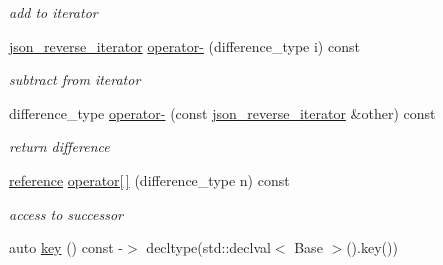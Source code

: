 \begin{DoxyCompactItemize}
\begin{DoxyCompactList}\small\item\em add to iterator \end{DoxyCompactList}\item 
\hyperlink{classnlohmann_1_1detail_1_1json__reverse__iterator}{json\+\_\+reverse\+\_\+iterator} \hyperlink{classnlohmann_1_1detail_1_1json__reverse__iterator_a9c9404de5f78134575e5f0aead10676f}{operator-\/} (difference\+\_\+type i) const \hypertarget{classnlohmann_1_1detail_1_1json__reverse__iterator_a9c9404de5f78134575e5f0aead10676f}{}\label{classnlohmann_1_1detail_1_1json__reverse__iterator_a9c9404de5f78134575e5f0aead10676f}

\begin{DoxyCompactList}\small\item\em subtract from iterator \end{DoxyCompactList}\item 
difference\+\_\+type \hyperlink{classnlohmann_1_1detail_1_1json__reverse__iterator_a2133803d87acc5bbb89f4c72adc43a0a}{operator-\/} (const \hyperlink{classnlohmann_1_1detail_1_1json__reverse__iterator}{json\+\_\+reverse\+\_\+iterator} \&other) const \hypertarget{classnlohmann_1_1detail_1_1json__reverse__iterator_a2133803d87acc5bbb89f4c72adc43a0a}{}\label{classnlohmann_1_1detail_1_1json__reverse__iterator_a2133803d87acc5bbb89f4c72adc43a0a}

\begin{DoxyCompactList}\small\item\em return difference \end{DoxyCompactList}\item 
\hyperlink{classnlohmann_1_1detail_1_1json__reverse__iterator_a42f51a69bac7b2aebb613b2164e457f1}{reference} \hyperlink{classnlohmann_1_1detail_1_1json__reverse__iterator_ad01fd54e148e36d9e24cf9ad0fe31d00}{operator\mbox{[}$\,$\mbox{]}} (difference\+\_\+type n) const \hypertarget{classnlohmann_1_1detail_1_1json__reverse__iterator_ad01fd54e148e36d9e24cf9ad0fe31d00}{}\label{classnlohmann_1_1detail_1_1json__reverse__iterator_ad01fd54e148e36d9e24cf9ad0fe31d00}

\begin{DoxyCompactList}\small\item\em access to successor \end{DoxyCompactList}\item 
auto \hyperlink{classnlohmann_1_1detail_1_1json__reverse__iterator_adc648a641e8e9a1072c5abd56ad06401}{key} () const -\/$>$ decltype(std\+::declval$<$ Base $>$().key())\hypertarget{classnlohmann_1_1detail_1_1json__reverse__iterator_adc648a641e8e9a1072c5abd56ad06401}{}\label{classnlohmann_1_1detail_1_1json__reverse__iterator_adc648a641e8e9a1072c5abd56ad06401}


\end{DoxyCompactItemize}
